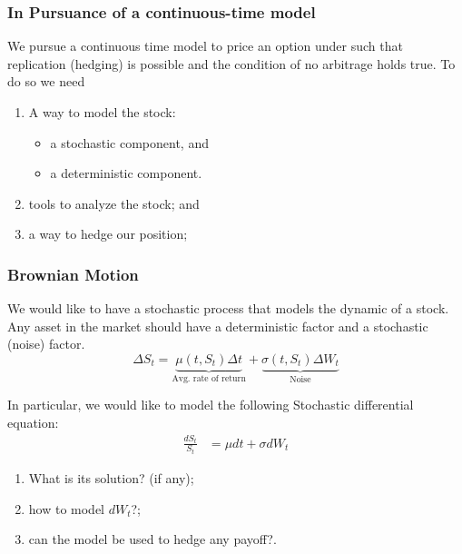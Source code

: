 \documentclass{beamer}
\begin{document}
\begin{frame}
\frametitle{In Pursuance of a continuous-time model}
We pursue a continuous time model to price an option under such that replication (hedging) is possible and the condition of no arbitrage holds true. To do so we need
\begin{enumerate}
	\item A way to model the stock:
	\begin{itemize}
		\item a stochastic component, and
		\item a deterministic component.
	\end{itemize}
	\item tools to analyze the stock; and
	\item a way to hedge our position;
\end{enumerate}
\end{frame}

\begin{frame}
\frametitle{Brownian Motion}
We would like to have a stochastic process that models the dynamic of a stock. Any asset in the market should have a deterministic factor and a stochastic (noise) factor.
\begin{equation}
	\Delta S_t = \underbrace{\mu(t, S_t) \Delta t}_\text{Avg. rate of return} +
				 \underbrace{\sigma(t, S_t) \Delta W_t}_\text{Noise}
\end{equation}
\end{frame}

\begin{frame}
	In particular, we would like to model the following Stochastic differential equation:
	\begin{align*}
		\frac{dS_t}{S_t} &= \mu dt + \sigma dW_t
	\end{align*}
\begin{enumerate}
	\item What is its solution? (if any);
	\item how to model $dW_t$?;
	\item can the model be used to hedge any payoff?.
\end{enumerate}
\end{frame}
\end{document}
